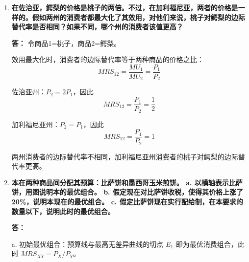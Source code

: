 \begin{enumerate}[label=\textbf{\arabic*.}, leftmargin=*]
\begin{center}
			\end{center}
			
			b. 安东尼奥的境况变好了。
			
			新的预算约束完全覆盖了原来的消费组合（$5$ 本新教材、$0$ 本旧教材），这保证了他的效用底线不会下降。同时，新旧教材的相对价格发生改变，预算空间向外扩张。由于二手教材的相对价格变得更便宜，他可以通过减少新教材购买、增加二手教材购买，从而触及一条比原来更高水平的无差异曲线（从 $IC_1$ 提升至 $IC_2$），实现整体福利的改善。
			
			\item\textbf{在佐治亚，鳄梨的价格是桃子的两倍。不过，在加利福尼亚，两者的价格是一样的。假如两州的消费者都最大化了其效用，对他们来说，桃子对鳄梨的边际替代率是否相同？如果不同，哪个州的消费者该值更高？}
			
			\textbf{答：}
			令商品1=桃子，商品2=鳄梨。
			
			效用最大化时，消费者的边际替代率等于两种商品的价格之比：
				$$MRS_{12} = \frac{MU_1}{MU_2} = \frac{P_1}{P_2}$$
			
			佐治亚州：$P_2=2P_1$，因此
			$$MRS_{12} = \frac{P_1}{P_2} = \frac{1}{2}$$
			
			加利福尼亚州：$P_2=P_1$，因此
			$$MRS_{12} = \frac{P_1}{P_2} = 1$$
			
			两州消费者的边际替代率不相同，加利福尼亚州消费者的桃子对鳄梨的边际替代率更高。
			
			\item \textbf{本在两种商品间分配其预算：比萨饼和墨西哥玉米煎饼。
				a. 以横轴表示比萨饼，用图说明本的最优组合。
				b. 假定现在对比萨饼收税，使得其价格上涨了20\%，说明本现在的最优组合。
				c. 假定比萨饼现在实行配给制，在本要求的数量以下，说明此时的最优组合。}
			
			\textbf{答：}

			a. 初始最优组合：预算线与最高无差异曲线的切点 $E_1$ 即为最优消费组合，此时 $MRS_{XY}=P_X/P_Y$。
			

\end{enumerate}
